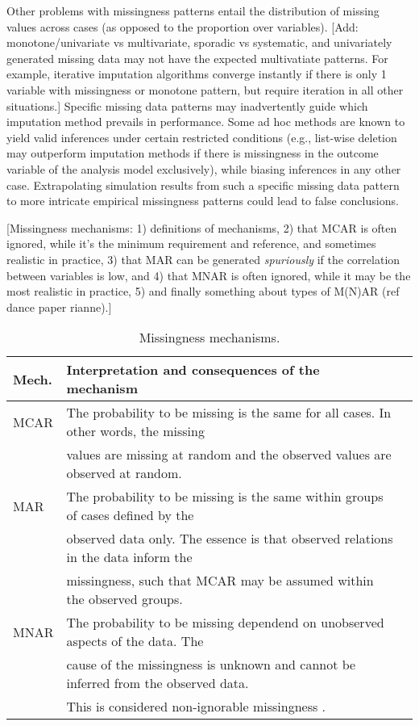 \documentclass[bimj,fleqn]{w-art}
\theoremstyle{plain}
\theoremstyle{definition}
\begin{document}
Other problems with missingness patterns entail the distribution of missing values across cases (as opposed to the proportion over variables). [Add: monotone/univariate vs multivariate, sporadic vs systematic, and univariately generated missing data may not have the expected multivatiate patterns. For example, iterative imputation algorithms converge instantly if there is only 1 variable with missingness or monotone pattern, but require iteration in all other situations.] Specific missing data patterns may inadvertently guide which imputation method prevails in performance. Some ad hoc methods are known to yield valid inferences under certain restricted conditions (e.g., list-wise deletion may outperform imputation methods if there is missingness in the outcome variable of the analysis model exclusively), while biasing inferences in any other case. Extrapolating simulation results from such a specific missing data pattern to more intricate empirical missingness patterns could lead to false conclusions. 

[Missingness mechanisms: 1) definitions of mechanisms, 2) that MCAR is often ignored, while it's the minimum requirement and reference, and sometimes realistic in practice, 3) that MAR can be generated \textit{spuriously} if the correlation between variables is low, and 4) that MNAR is often ignored, while it may be the most realistic in practice, 5) and finally something about types of M(N)AR (ref dance paper rianne).]


\begin{table}[htb]
\begin{center}
\caption{Missingness mechanisms.}
\begin{tabular}{lll}
\hline
Mech. & Interpretation and consequences of the mechanism \\
\hline  
MCAR  & The probability to be missing is the same for all cases. In other words, the missing \\
      & values are missing at random and the observed values are observed at random. \\
MAR   & The probability to be missing is the same within groups of cases defined by the \\
      & observed data only. The essence is that observed relations in the data inform the \\
      & missingness, such that MCAR may be assumed within the observed groups. \\
MNAR  & The probability to be missing dependend on unobserved aspects of the data. The \\
      & cause of the missingness is unknown and cannot be inferred from the observed data. \\
      & This is considered non-ignorable missingness \citep[see e.g.][]{rubi76}. \\
\hline
\end{tabular}
\end{center}
\end{table}
\end{document}
